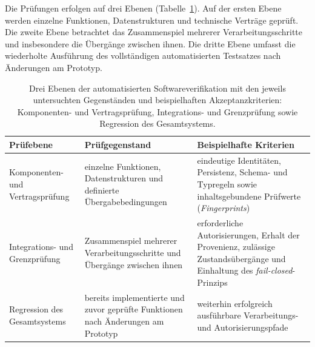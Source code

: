 Die Prüfungen erfolgen auf drei Ebenen
(Tabelle~\ref{tab:validation_software_levels}). Auf der ersten Ebene werden
einzelne Funktionen, Datenstrukturen und technische Verträge geprüft. Die
zweite Ebene betrachtet das Zusammenspiel mehrerer Verarbeitungsschritte und
insbesondere die Übergänge zwischen ihnen. Die dritte Ebene umfasst die
wiederholte Ausführung des vollständigen automatisierten Testsatzes nach
Änderungen am Prototyp.

\begin{table}[htbp]
    \centering
    \small
    \caption[Ebenen der automatisierten Softwareverifikation]{
        Drei Ebenen der automatisierten Softwareverifikation mit den jeweils
        untersuchten Gegenständen und beispielhaften Akzeptanzkriterien:
        Komponenten- und Vertragsprüfung, Integrations- und Grenzprüfung sowie
        Regression des Gesamtsystems.}
    \label{tab:validation_software_levels}
    \begin{tabular}{p{3.6cm}p{5.0cm}p{4.8cm}}
        \hline
        \textbf{Prüfebene} &
        \textbf{Prüfgegenstand} &
        \textbf{Beispielhafte Kriterien} \\
        \hline

        Komponenten- und Vertragsprüfung &
        einzelne Funktionen, Datenstrukturen und definierte
        Übergabebedingungen &
        eindeutige Identitäten, Persistenz,
        Schema- und Typregeln sowie
        inhaltsgebundene Prüfwerte (\emph{Fingerprints}) \\

        Integrations- und Grenzprüfung &
        Zusammenspiel mehrerer Verarbeitungsschritte und Übergänge
        zwischen ihnen &
        erforderliche Autorisierungen,
        Erhalt der Provenienz,
        zulässige Zustandsübergänge und
        Einhaltung des \emph{fail-closed}-Prinzips \\

        Regression des Gesamtsystems &
        bereits implementierte und zuvor geprüfte Funktionen nach
        Änderungen am Prototyp &
        weiterhin erfolgreich ausführbare Verarbeitungs- und
        Autorisierungspfade \\
        \hline
    \end{tabular}
\end{table}

